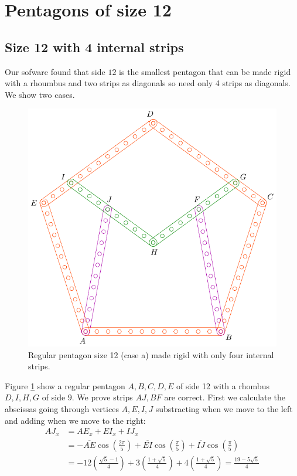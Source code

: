 \documentclass[11pt]{article}
\begin{document}

\section{Pentagons of size 12}

\subsection{Size 12 with 4 internal strips}

Our sofware found that side $12$ is the smallest pentagon that can be made rigid with a rhoumbus and two strips as diagonals so need only 4 strips as diagonals. We show two cases.

\begin{figure}[h]
 \centering
 \includegraphics[scale=0.8]{12/penta12a}
 \caption{Regular pentagon size 12 (case a) made rigid with only four internal strips.}
 \label{fig:penta12a}
\end{figure}

Figure \ref{fig:penta12a} show a regular pentagon $A,B,C,D,E$ of side 12 with a rhombus $D,I,H,G$ of side $9$. We prove strips $AJ,BF$ are correct. First we calculate the abscissas going through vertices $A,E,I,J$ substracting when we move to the left and adding when we move to the right:
\begin{align}
AJ_x &= AE_x + EI_x + IJ_x\nonumber\\
 &= -\overline{AE}\cos\left(\frac{2\pi}5\right)
 + \overline{EI}\cos\left(\frac{\pi}5\right) 
 + \overline{IJ}\cos\left(\frac{\pi}5\right)\nonumber\\
 &= -12\left(\frac{\sqrt5 - 1}4\right)
  +3\left(\frac{1+\sqrt5}4\right)
  +4\left(\frac{1+\sqrt5}4\right) 
  = \frac{19-5\sqrt5}4
\end{align}
\end{document}
